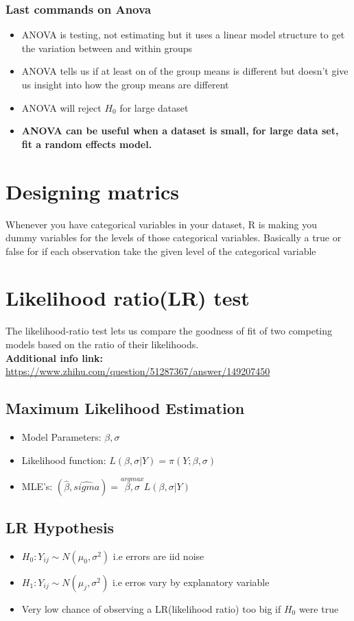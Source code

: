 \documentclass{article}
\theoremstyle{definition}
\theoremstyle{thrm}
\theoremstyle{lma}
\theoremstyle{ppst}
\theoremstyle{crlr}
\begin{document}
\subsubsection{Last commands on Anova}
\begin{itemize}
	\item ANOVA is testing, not estimating but it uses a linear model structure to get the variation between and within groups
	\item ANOVA tells us if at least on of the group means is different but doesn't give us insight into how the group means are different
	\item ANOVA will reject $H_0$ for large dataset
	\item \textbf{ANOVA can be useful when a dataset is small, for large data set, fit a random effects model.}
\end{itemize}

\section{Designing matrics}
Whenever you have categorical variables in your dataset, R is making you dummy variables for the levels of those categorical variables. Basically a true or false for if each observation take the given level of the categorical variable


\section{Likelihood ratio(LR) test}
The likelihood-ratio test lets us compare the goodness of fit of two competing models based on the ratio of their likelihoods. \\
\textbf{Additional info link:} \url{https://www.zhihu.com/question/51287367/answer/149207450}

\subsection{Maximum Likelihood Estimation}
\begin{itemize}
	\item Model Parameters: $\beta, \sigma$
	\item Likelihood function: $L(\beta,\sigma|Y) = \pi(Y;\beta,\sigma)$
	\item MLE's: $(\hat{\beta}, \hat{sigma}) = \stackrel{argmax}{\beta,\sigma}L(\beta,\sigma|Y)$
\end{itemize}

\subsection{LR Hypothesis}
\begin{itemize}
	\item $H_0:Y_{ij}\sim N(\mu_0, \sigma^2)$ i.e errors are iid noise
	\item $H_1:Y_{ij}\sim N(\mu_j, \sigma^2)$ i.e erros vary by explanatory variable
	\item Very low chance of observing a LR(likelihood ratio) too big if $H_0$ were true
\end{itemize}
\end{document}
